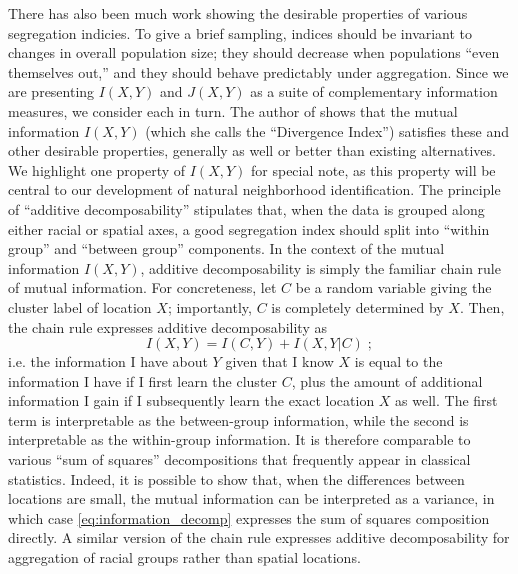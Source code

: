 	There has also been much work showing the desirable properties of various segregation indicies. To give a brief sampling, indices should be invariant to changes in overall population size; they should decrease when populations ``even themselves out,'' and they should behave predictably under aggregation. Since we are presenting $I(X,Y)$ and $J(X,Y)$ as a suite of complementary information measures, we consider each in turn. The author of \cite{Roberto2015a} shows that the mutual information $I(X,Y)$ (which she calls the ``Divergence Index'') satisfies these and other desirable properties, generally as well or better than existing alternatives. We highlight one property of $I(X,Y)$ for special note, as this property will be central to our development of natural neighborhood identification. The principle of ``additive decomposability'' \cite{Reardon2002} stipulates that, when the data is grouped along either racial or spatial axes, a good segregation index should split into ``within group'' and ``between group'' components. In the context of the mutual information $I(X,Y)$, additive decomposability is simply the familiar chain rule of mutual information. For concreteness, let $C$ be a random variable giving the cluster label of location $X$; importantly, $C$ is completely determined by $X$. Then, the chain rule expresses additive decomposability as 
	\begin{equation}
		I(X,Y) = I(C,Y) + I(X,Y|C)\;; \label{eq:information_decomp}
	\end{equation}
	i.e. the information I have about $Y$ given that I know $X$ is equal to the information I have if I first learn the cluster $C$, plus the amount of additional information I gain if I subsequently learn the exact location $X$ as well. The first term is interpretable as the between-group information, while the second is interpretable as the within-group information. It is therefore comparable to various ``sum of squares'' decompositions that frequently appear in classical statistics. Indeed, it is possible to show that, when the differences between locations are small, the mutual information can be interpreted as a variance, in which case \eqref{eq:information_decomp} expresses the sum of squares composition directly. A similar version of the chain rule expresses additive decomposability for aggregation of racial groups rather than spatial locations. 

